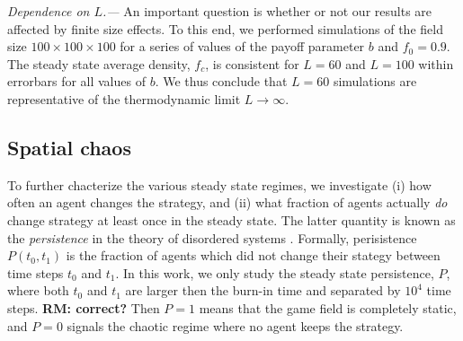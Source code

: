 \documentclass[a4paper]{jpconf}
\begin{document}
\emph{Dependence on $L$.---} An important question is whether or not our results are affected by finite size effects. To this end, we performed simulations of the field size $100\times 100\times 100$ for a series of values of the payoff parameter $b$ and $f_0=0.9$. The steady state average density, $f_c$, is consistent for $L=60$ and $L=100$ within errorbars for all values of $b$. We thus conclude that $L=60$ simulations are representative of the thermodynamic limit $L\to\infty$.

\subsection{Spatial chaos}
\label{subsec:chaos}

To further chacterize the various steady state regimes, we investigate (i) how often an agent
changes the strategy, and (ii) what fraction of agents actually \emph{do} change
strategy at least once in the steady state. 
The latter quantity is known as the \emph{persistence} in the theory of disordered systems \cite{Bray1994, Majumdar1999}. Formally, perisistence $P(t_0, t_1)$ is the fraction of agents which did not change their stategy between time steps $t_0$ and $t_1$. In this work, we only study the steady state persistence, $P$, where both $t_0$ and $t_1$ are larger then the burn-in time and separated by $10^4$ time steps. \textbf{RM: correct?} Then $P=1$ means that the game field is completely static, and $P=0$ signals the chaotic regime where no agent keeps the strategy. 
\end{document}
